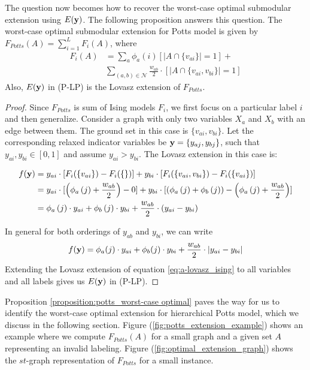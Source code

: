 The question now becomes how to recover the worst-case optimal submodular extension using $E({\bf y})$. The following proposition answers this question.
{\proposition The worst-case optimal  submodular extension for Potts model is given by $F_{Potts}(A) = \sum_{i = 1}^L F_i(A)$, where
\begin{align}
    F_i(A) &= \sum_a \phi_{a}(i) [|A \cap \{v_{ai}\}| = 1] + \nonumber \\
           &\sum_{(a, b) \in {\mathcal N}} \frac{w_{ab}}{2} \cdot [|A \cap \{v_{ai}, v_{bi}\}| = 1]
\end{align}
Also, $E({\bf y})$ in (P-LP) is the Lovasz extension of $F_{Potts}$.
\label{proposition:potts_worst-case optimal}}
\begin{proof}
Since $F_{Potts}$ is sum of Ising models $F_i$, we first focus on a particular label $i$ and then generalize. Consider a graph with only two variables $X_a$ and $X_b$ with an edge between them. The ground set in this case is $\{v_{ai}, v_{bi}\}$. Let the corresponding relaxed indicator variables be ${\bf y} = \{y_{aj}, y_{bj}\}$, such that $y_{ai}, y_{bi} \in [0, 1]$ and assume $y_{ai} > y_{bi}$. The Lovasz extension in this case is:

\begin{align}
f({\bf y}) &= y_{ai} \cdot [F_i(\{v_{ai}\}) - F_i(\{\})] + y_{bi} \cdot [F_i(\{v_{ai}, v_{bi}\}) - F_i(\{v_{ai}\})] \nonumber \\
&= y_{ai} \cdot [\left(\phi_{a}\left(j\right) + \frac{w_{ab}}{2}\right) - 0] + y_{bi} \cdot [\left(\phi_{a}\left(j\right) + \phi_{b}\left(j\right)\right) - \left(\phi_{a}\left(j\right) + \frac{w_{ab}}{2}\right)] \nonumber \\
&=  \phi_{a}\left(j\right) \cdot y_{ai} + \phi_{b}\left(j\right) \cdot y_{bi} + \frac{w_{ab}}{2} \cdot \left(y_{ai} - y_{bi}\right)
\end{align}

In general for both orderings of $y_{ab}$ and $y_{bi}$, we can write
%
\begin{equation}
f({\bf y}) = \phi_{a}(j) \cdot y_{ai} + \phi_{b}(j) \cdot y_{bi} + \frac{w_{ab}}{2} \cdot |y_{ai} - y_{bi}|
\label{eq:a-lovasz_ising}
\end{equation}
%
Extending the Lovasz extension of equation \eqref{eq:a-lovasz_ising} to all variables and all labels gives us $E({\bf y})$ in (P-LP). 

\end{proof}
\vspace{-1mm}
Proposition \ref{proposition:potts_worst-case optimal} paves the way for us to identify the worst-case optimal extension for hierarchical Potts model, which we discuss in the following section. Figure (\ref{fig:potts_extension_example}) shows an example where we compute $F_{Potts}(A)$ for a small graph and a given set $A$ representing an invalid labeling. Figure (\ref{fig:optimal_extension_graph}) shows the $st$-graph representation of $F_{Potts}$ for a small instance.

